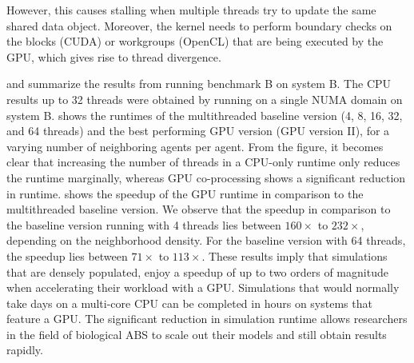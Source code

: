 \documentclass[conference]{IEEEtran}
\begin{document}
However, this causes stalling when multiple threads try to update the same shared data object.
Moreover, the kernel needs to perform boundary checks on the blocks (CUDA) or workgroups (OpenCL) that are being executed by the GPU, which gives rise to thread divergence.
\par {} and  summarize the results from running benchmark B on system B.
The CPU results up to 32 threads were obtained by running on a single NUMA domain on system B.
 shows the runtimes of the multithreaded baseline version (4, 8, 16, 32, and 64 threads) and the best performing GPU version (GPU version II), for a varying number of neighboring agents per agent.
From the figure, it becomes clear that increasing the number of threads in a CPU-only runtime only reduces the runtime marginally, whereas GPU co-processing shows a significant reduction in runtime. 
 shows the speedup of the GPU runtime in comparison to the multithreaded baseline version.
We observe that the speedup in comparison to the baseline version running with 4 threads lies between $160\times$ to $232\times$, depending on the neighborhood density.
For the baseline version with 64 threads, the speedup lies between $71\times$ to $113\times$.
These results imply that simulations that are densely populated, enjoy a speedup of up to two orders of magnitude when accelerating their workload with a GPU.
Simulations that would normally take days on a multi-core CPU can be completed in hours on systems that feature a GPU.
The significant reduction in simulation runtime allows researchers in the field of biological ABS to scale out their models and still obtain results rapidly.
\end{document}
